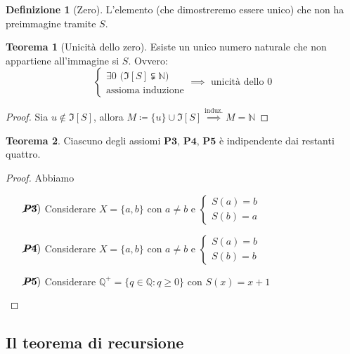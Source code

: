 \documentclass[a4paper,10pt]{article}
\theoremstyle{definition}
\theoremstyle{indentdefinition}
\newtheorem{defn}{Definizione}[section]
\theoremstyle{indentpostulate}
\theoremstyle{indenttheorem}
\newtheorem{thm}{Teorema}[section]
\theoremstyle{myremark}
\theoremstyle{indentgeneral}
\newenvironment{myboxed} 
{\noindent\begin{lrbox}{\mybox}\begin{minipage}{\textwidth}}
{\end{minipage}\end{lrbox}\fbox{\usebox{\mybox}}}
\begin{document}
\begin{defn}[Zero]
   L'elemento (che dimostreremo essere unico) che  non ha preimmagine tramite $S$.
\end{defn}

\begin{thm}[Unicità dello zero]
    Esiste un unico numero naturale che non appartiene all'immagine si $S$. Ovvero:
    $$\begin{cases}
        \exists0 \text{ ($\Im[S]\subsetneqq \mathbb{N}$)}\\
        \text{assioma induzione}
    \end{cases}\implies \text{ unicità dello } 0$$
\end{thm}

\begin{proof}
    Sia $u\notin \Im[S]$, allora $M\coloneqq \{u\}\cup \Im[S]\overset{\text{induz.}}{\implies} M=\mathbb{N}$
\end{proof}

\begin{myboxed}
\begin{thm}
    Ciascuno degli assiomi $\textbf{P3, P4, P5}$ è indipendente dai restanti quattro.
\end{thm}
\end{myboxed}

\begin{proof}
    Abbiamo
    \begin{itemize}
        \item[$\cancel{\boldsymbol{P3}})$] Considerare $X=\{a,b\}$ con $a\ne b$ e $\begin{cases}
            S(a)=b\\
            S(b)=a
        \end{cases}$
        \item[$\cancel{\boldsymbol{P4}})$] Considerare $X=\{a,b\}$ con $a\ne b$ e $\begin{cases}
            S(a)=b\\
            S(b)=b
        \end{cases}$
        \item[$\cancel{\boldsymbol{P5}})$] Considerare $\mathbb{Q}^+=\{q\in \mathbb{Q}: q\ge 0\}$ con $S(x)=x+1$
    \end{itemize}
\end{proof}

\subsection{Il teorema di recursione}
\end{document}

